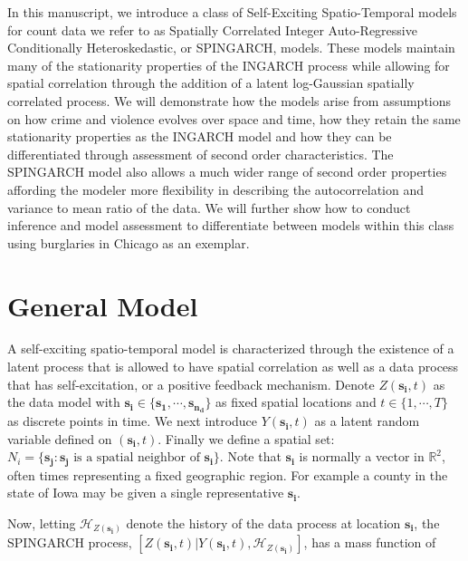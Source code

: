 \documentclass[11pt]{isuthesis}
\begin{document}
In this manuscript, we introduce a class of Self-Exciting Spatio-Temporal models for count data we refer to as Spatially Correlated Integer Auto-Regressive Conditionally Heteroskedastic, or SPINGARCH, models.  These models maintain many of the stationarity properties of the INGARCH process while allowing for spatial correlation through the addition of a latent log-Gaussian spatially correlated process.  We will demonstrate how the models arise from assumptions on how crime and violence evolves over space and time, how they retain the same stationarity properties as the INGARCH model and how they can be differentiated through assessment of second order characteristics.  The SPINGARCH model also allows a much wider range of second order properties affording the modeler more flexibility in describing the autocorrelation and variance to mean ratio of the data.  We will further show how to conduct inference and model assessment to differentiate between models within this class using burglaries in Chicago as an exemplar.


\section{General Model}

A self-exciting spatio-temporal model is characterized through the existence of a latent process that is allowed to have spatial correlation as well as a data process that has self-excitation, or a positive feedback mechanism.  Denote $Z(\boldsymbol{s_i},t)$ as the data model with $\boldsymbol{s_i} \in \{\boldsymbol{s_1},\cdots,\boldsymbol{s_{n_d}}\}$ as fixed spatial locations and $t \in \{1,\cdots,T\}$ as discrete points in time.  We next introduce $Y(\boldsymbol{s_i},t)$ as a latent random variable defined on $(\boldsymbol{s_i},t)$. Finally we define a spatial set: $N_i=\{\boldsymbol{s_j} :\boldsymbol{s_j}\text{ is a spatial neighbor of } \boldsymbol{s_i}\}$.  Note that $\boldsymbol{s_i}$ is normally a vector in $\mathbb{R}^2$, often times representing a fixed geographic region. For example a county in the state of Iowa may be given a single representative $\boldsymbol{s_i}$.  

Now, letting $\mathcal{H}_{Z(\boldsymbol{s_i})}$ denote the history of the data process at location $\boldsymbol{s_i}$,  the SPINGARCH process, $\left[ Z(\boldsymbol{s_i},t)|Y(\boldsymbol{s_i},t),\mathcal{H}_{Z(\boldsymbol{s_i})}\right] $, has a mass function of
\end{document}

